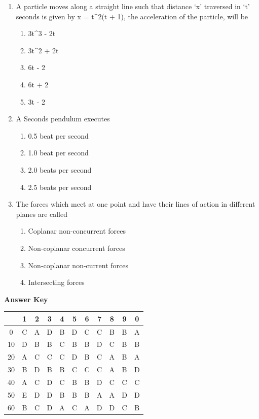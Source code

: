 \documentclass[11pt,a4paper]{article}
\begin{document}
\begin{enumerate}
\begin{enumerate*}[itemjoin=\qquad, label=\Alph*.]
\item{2 cm}
\item{3 cm}
\item{4 cm}
\item{5 cm}
\end{enumerate*}
\item{A particle moves along a straight line such that distance `x' traversed in `t' seconds is given by x = t\^{}2(t + 1), the acceleration of the particle, will be
}
\begin{enumerate}[label=\Alph*.]
\item{3t\^{}3 - 2t}
\item{3t\^{}2 + 2t}
\item{6t - 2}
\item{6t + 2}
\item{3t - 2}
\end{enumerate}
\item{A Seconds pendulum executes}
\begin{enumerate}[label=\Alph*.]
\item{0.5 beat per second}
\item{1.0 beat per second}
\item{2.0 beats per second}
\item{2.5 beats per second}
\end{enumerate}
\item{The forces which meet at one point and have their lines of action in different planes are called}
\begin{enumerate}[label=\Alph*.]
\item{Coplanar non-concurrent forces}
\item{Non-coplanar concurrent forces}
\item{Non-coplanar non-current forces}
\item{Intersecting forces}
\end{enumerate}
\end{enumerate}
\textbf{Answer Key}
\begin{tabular}{ | c | c c c c c c c c c c | }
\hline
 & 1 & 2 & 3 & 4 & 5 & 6 & 7 & 8 & 9 & 0 \\
\hline
0 & C & A & D & B & D & C & C & B & B & A \\
10 & D & B & B & C & B & B & D & C & B & B \\
20 & A & C & C & C & D & B & C & A & B & A \\
30 & B & D & B & B & C & C & C & A & B & D \\
40 & A & C & D & C & B & B & D & C & C & C \\
50 & E & D & D & B & B & B & A & A & D & D \\
60 & B & C & D & A & C & A & D & D & C & B \\
\hline
\end{tabular}
\clearpage
\end{document}
